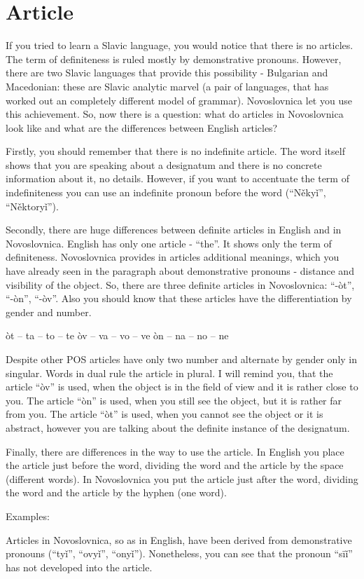 \section{Article}

If you tried to learn a Slavic language, you would notice that there is no articles. The term of definiteness is ruled mostly by demonstrative pronouns. However, there are two Slavic languages that provide this possibility - Bulgarian and Macedonian: these are Slavic analytic marvel (a pair of languages, that has worked out an completely different model of grammar). Novoslovnica let you use this achievement. So, now there is a question: what do articles in Novoslovnica look like and what are the differences between English articles?

Firstly, you should remember that there is no indefinite article. The word itself shows that you are speaking about a designatum and there is no concrete information about it, no details. However, if you want to accentuate the term of indefiniteness you can use an indefinite pronoun before the word (“Někyǐ”, “Něktoryǐ”).

Secondly, there are huge differences between definite articles in English and in Novoslovnica. English has only one article - “the”. It shows only the term of definiteness. Novoslovnica provides in articles additional meanings, which you have already seen in the paragraph about demonstrative pronouns - distance and visibility of the object. So, there are three definite articles in Novoslovnica: “-òt”, “-òn”, “-òv”. Also you should know that these articles have the differentiation by gender and number. 

òt – ta – to – te
òv – va – vo – ve
òn – na – no – ne

Despite other POS articles have only two number and alternate by gender only in singular. Words in dual rule the article in plural. I will remind you, that the article “òv” is used, when the object is in the field of view and it is rather close to you. The article “òn” is used, when you still see the object, but it is rather far from you. The article “òt” is used, when you cannot see the object or it is abstract, however you are talking about the definite instance of the designatum.

Finally, there are differences in the way to use the article. In English you place the article just before the word, dividing the word and the article by the space (different words). In Novoslovnica you put the article just after the word, dividing the word and the article by the hyphen (one word).

Examples: 


Articles in Novoslovnica, so as in English, have been derived from demonstrative pronouns (“tyǐ”, “ovyǐ”, “onyǐ”). Nonetheless, you can see that the pronoun “sïǐ” has not developed into the article.
